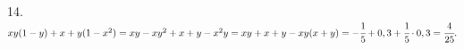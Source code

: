 14. $xy(1-y)+x+y(1-x^2)=xy-xy^2+x+y-x^2y=xy+x+y-xy(x+y)=-\cfrac{1}{5}+0,3+\cfrac{1}{5}\cdot0,3=\cfrac{4}{25}.$\\
